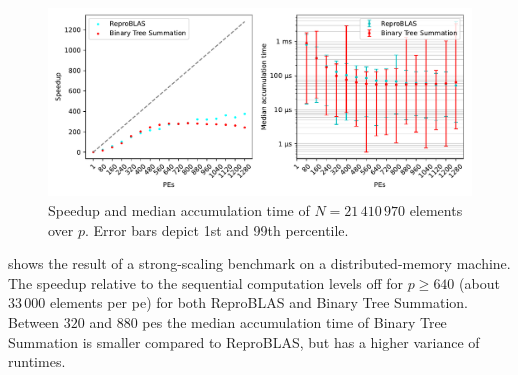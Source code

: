\begin{figure}
\centering
\includegraphics[scale=0.72]{figures/scaling.pdf}
\caption{Speedup and median accumulation time of $N=21\,410\,970$ elements over $p$. Error bars depict 1st and 99th percentile.}
\label{fig:ClusterScaling}
\end{figure}


 shows the result of a strong-scaling benchmark on a distributed-memory machine.
The speedup relative to the sequential computation levels off for $p \geq 640$ (about $33\,000$ elements per \gls{pe}) for both ReproBLAS and Binary Tree Summation.
Between $320$ and $880$ \glspl{pe} the median accumulation time of Binary Tree Summation is smaller compared to ReproBLAS, but has a higher variance of runtimes.
